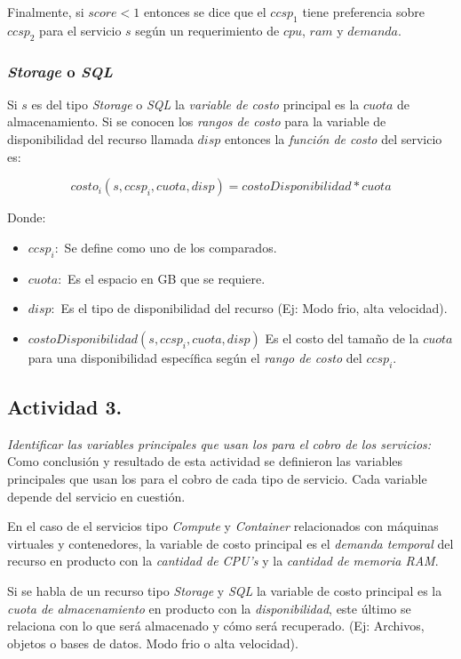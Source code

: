 Finalmente, si $score < 1$ entonces se dice que el $ccsp_1$ tiene preferencia sobre $ccsp_2$ para el servicio $s$ según un requerimiento de $cpu$, $ram$ y $demanda$.

\subsubsection{\emph{Storage} o \emph{SQL}}
Si $s$ es del tipo \emph{Storage} o \emph{SQL} la \emph{variable de costo} principal es la $cuota$ de almacenamiento. Si se conocen los \emph{rangos de costo} para la variable de disponibilidad del recurso llamada $disp$ entonces la \emph{función de costo} del servicio es:

\[ costo_i(s,ccsp_i, cuota, disp) = costoDisponibilidad*cuota \]

Donde:
\begin{itemize}
    \item $ccsp_i:$ Se define como uno de los  comparados.
    \item $cuota:$ Es el espacio en GB que se requiere.
    \item $disp:$ Es el tipo de disponibilidad del recurso (Ej: Modo frio, alta velocidad).
    \item $costoDisponibilidad(s,ccsp_i,cuota,disp)$ Es el costo del tamaño de la $cuota$ para una disponibilidad específica según el \emph{rango de costo} del $ccsp_i$.
\end{itemize}

\subsection{Actividad 3.}
\emph{Identificar las variables principales que usan los  para el cobro de los servicios:}
\newline\newline
Como conclusión y resultado de esta actividad se definieron las variables principales que usan los  para el cobro de cada tipo de servicio. Cada variable depende del servicio en cuestión.
\newline

En el caso de el servicios tipo \emph{Compute} y \emph{Container} relacionados con máquinas virtuales y contenedores, la variable de costo principal es el \emph{demanda temporal} del recurso en producto con la \emph{cantidad de CPU's} y la \emph{cantidad de memoria RAM}.
\newline

Si se habla de un recurso tipo \emph{Storage} y \emph{SQL} la variable de costo principal es la \emph{cuota de almacenamiento} en producto con la \emph{disponibilidad}, este último se relaciona con lo que será almacenado y cómo será recuperado. (Ej: Archivos, objetos o bases de datos. Modo frio o alta velocidad).
\newline

